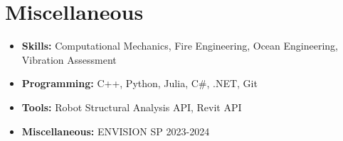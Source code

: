 \documentclass[12pt]{article}
\begin{document}
\section{Miscellaneous}
\begin{itemize}
    \itemsep=-.3em
    \item \textbf{Skills:} Computational Mechanics, Fire Engineering, Ocean Engineering, Vibration Assessment
    \item \textbf{Programming:} C++, Python, Julia, C\#, .NET, Git
    \item \textbf{Tools:} Robot Structural Analysis API, Revit API
    \item \textbf{Miscellaneous:} ENVISION SP 2023-2024
\end{itemize}
\end{document}
